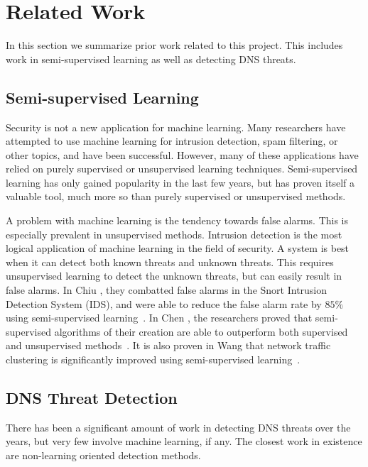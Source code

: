 \section{Related Work}

In this section we summarize prior work related to this project.
This includes work in semi-supervised learning as well as detecting DNS threats.

\subsection{Semi-supervised Learning}

Security is not a new application for machine learning.
Many researchers have attempted to use machine learning for intrusion detection, spam filtering,
or other topics, and have been successful.
However, many of these applications have relied on purely supervised or unsupervised learning techniques.
Semi-supervised learning has only gained popularity in the last few years, but has proven itself
a valuable tool, much more so than purely supervised or unsupervised methods.

A problem with machine learning is the tendency towards false alarms.
This is especially prevalent in unsupervised methods.
Intrusion detection is the most logical application of machine learning in the field of security.
A system is best when it can detect both known threats and unknown threats.
This requires unsupervised learning to detect the unknown threats, but can easily result in false alarms.
In Chiu \etal{}, they combatted false alarms in the Snort Intrusion Detection System (IDS), and were
able to reduce the false alarm rate by $85\%$ using semi-supervised learning~\cite{semialarm}.
In Chen \etal{}, the researchers proved that semi-supervised algorithms of their creation are able
to outperform both supervised and unsupervised methods~\cite{semidetect}.
It is also proven in Wang \etal{} that network traffic clustering is significantly improved using
semi-supervised learning~\cite{seminovel}.

\subsection{DNS Threat Detection}

There has been a significant amount of work in detecting DNS threats over the years, but very few
involve machine learning, if any.
The closest work in existence are non-learning oriented detection methods.

